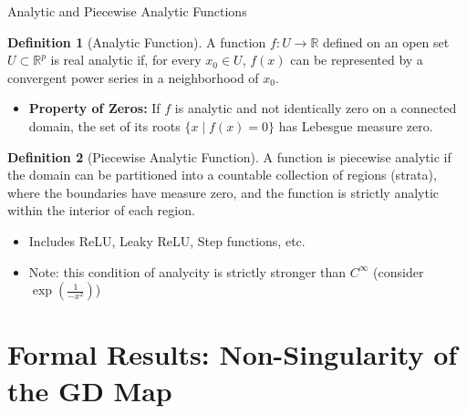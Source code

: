 \documentclass[10pt, aspectratio=169]{beamer}
\theoremstyle{definition}
\newtheorem{defn}{Definition}
\begin{document}
\begin{frame}{Analytic and Piecewise Analytic Functions}
    \begin{defn}[Analytic Function]
        A function $f: U \to \mathbb{R}$ defined on an open set $U \subset \mathbb{R}^p$ is real analytic if, for every $x_0 \in U$, $f(x)$ can be represented by a convergent power series in a neighborhood of $x_0$.
    \end{defn}
    \begin{itemize}
        \item \textbf{Property of Zeros:} If $f$ is analytic and not identically zero on a connected domain, the set of its roots $\{x \mid f(x) = 0\}$ has Lebesgue measure zero.
    \end{itemize}
    \begin{defn}[Piecewise Analytic Function]
        A function is piecewise analytic if the domain can be partitioned into a countable collection of regions (strata), where the boundaries have measure zero, and the function is strictly analytic within the interior of each region.
    \end{defn}
    \begin{itemize}
        \item Includes ReLU, Leaky ReLU, Step functions, etc.
        \item Note: this condition of analycity is strictly stronger than \(C^\infty\) (consider \(\exp\left( {\frac{1}{-x^2}} \right)\))
    \end{itemize}

\end{frame}

\section{Formal Results: Non-Singularity of the GD Map}
\end{document}
